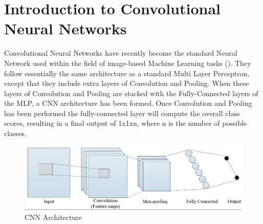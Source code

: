 \documentclass[12pt]{report}
\begin{document}
\section{Introduction to Convolutional Neural Networks}
\begin{flushleft}
Convolutional Neural Networks have recently become the standard Neural Network used within the field of image-based Machine Learning tasks (\cite{o2015introduction}). They follow essentially the same architecture as a standard Multi Layer Perceptron, except that they include extra layers of Convolution and Pooling. When these layers of Convolution and Pooling are stacked with the Fully-Connected layers of the MLP, a CNN architecture has been formed. Once Convolution and Pooling has been performed the fully-connected layer will compute the overall class scores, resulting in a final output of 1x1xn, where n is the number of possible classes.
\end{flushleft}

\vspace{0.5cm}
\begin{figure}[h]
	\centering
	\includegraphics[width=12cm]{convo}
	\caption{CNN Architecture}
	\label{fig:convo}
\end{figure}

\newpage
\end{document}
